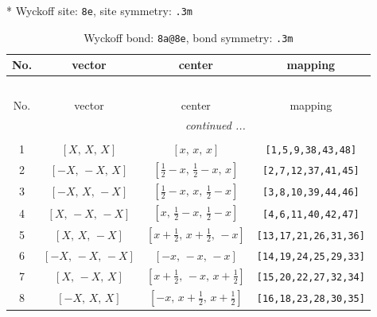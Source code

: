 \documentclass[fleqn,8pt]{jsarticle}
\begin{document}
* Wyckoff site: {\tt 8e}, site symmetry: {\tt .3m}
\renewcommand{\arraystretch}{1.2}
\begin{longtable}{cccc}
\caption{Wyckoff bond: {\tt 8a@8e}, bond symmetry: {\tt .3m}}
 \\
 \hline \hline
No. & vector & center & mapping \\ \hline \endfirsthead

\multicolumn{3}{l}{\tablename\ \thetable{}} \\
 \hline \hline
No. & vector & center & mapping \\ \hline \endhead

 \hline \hline
\multicolumn{3}{r}{\footnotesize\it continued ...} \\ \endfoot

 \hline \hline
\multicolumn{3}{r}{} \\ \endlastfoot

1 & $\left[ X,\, X,\, X \right]$ & $\left[ x,\, x,\, x \right]$ & {\tt [1,5,9,38,43,48]} \\ \hline
2 & $\left[ - X,\, - X,\, X \right]$ & $\left[ \frac{1}{2} - x,\, \frac{1}{2} - x,\, x \right]$ & {\tt [2,7,12,37,41,45]} \\ \hline
3 & $\left[ - X,\, X,\, - X \right]$ & $\left[ \frac{1}{2} - x,\, x,\, \frac{1}{2} - x \right]$ & {\tt [3,8,10,39,44,46]} \\ \hline
4 & $\left[ X,\, - X,\, - X \right]$ & $\left[ x,\, \frac{1}{2} - x,\, \frac{1}{2} - x \right]$ & {\tt [4,6,11,40,42,47]} \\ \hline
5 & $\left[ X,\, X,\, - X \right]$ & $\left[ x + \frac{1}{2},\, x + \frac{1}{2},\, - x \right]$ & {\tt [13,17,21,26,31,36]} \\ \hline
6 & $\left[ - X,\, - X,\, - X \right]$ & $\left[ - x,\, - x,\, - x \right]$ & {\tt [14,19,24,25,29,33]} \\ \hline
7 & $\left[ X,\, - X,\, X \right]$ & $\left[ x + \frac{1}{2},\, - x,\, x + \frac{1}{2} \right]$ & {\tt [15,20,22,27,32,34]} \\ \hline
8 & $\left[ - X,\, X,\, X \right]$ & $\left[ - x,\, x + \frac{1}{2},\, x + \frac{1}{2} \right]$ & {\tt [16,18,23,28,30,35]} \\
\end{longtable}
\renewcommand{\arraystretch}{1.2}
\end{document}
